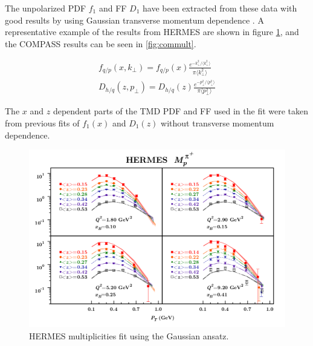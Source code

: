 The unpolarized PDF $f_1$ and FF $D_1$ have been extracted from these data with good results by using Gaussian transverse momentum dependence \cite{tmds-anselmino:2013}.  A representative example of the results from HERMES are shown in figure \ref{fig:hermult}, and the COMPASS results can be seen in \ref{fig:commult}.

\begin{gather}\label{eqn:gaussian-ansatz}
	f_{q/p} (x, k_{\perp}) = f_{q/p} (x) \frac{e^{-k_{\perp}^2 / \langle k_{\perp}^2 \rangle}}{\pi \langle k_{\perp}^2 \rangle} \\ 
	D_{h/q} (z, p_{\perp}) = D_{h/q} (z) \frac{e^{-p_{\perp}^2 / \langle p_{\perp}^2 \rangle}}{\pi \langle p_{\perp}^2 \rangle} 
\end{gather}

The $x$ and $z$ dependent parts of the TMD PDF and FF used in the fit were taken from previous fits of $f_1(x)$ and $D_1(z)$ without transverse momentum dependence.

\begin{figure}
	\centering
	\includegraphics[width=\textwidth]{image/plots/introduction/hermes_multi_fit.png}
	\caption{HERMES multiplicities fit using the Gaussian ansatz.}
	\label{fig:hermult}
\end{figure}

